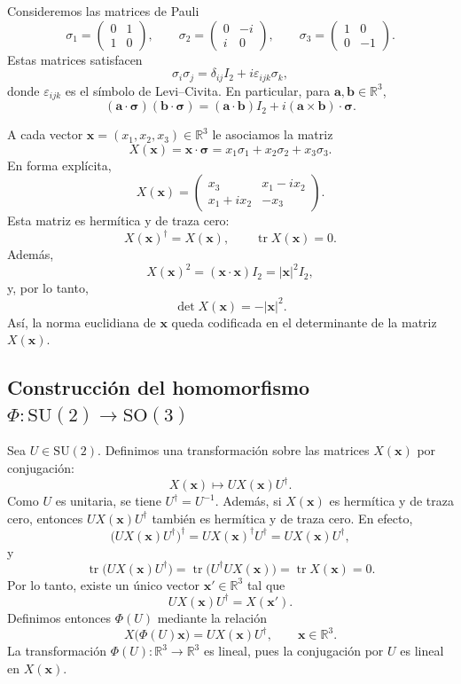 \documentclass[11pt,a4paper]{article}
\newcommand{\R}{\mathbb{R}}
\newcommand{\SU}{\mathrm{SU}}
\newcommand{\SO}{\mathrm{SO}}
\newcommand{\tr}{\operatorname{tr}}
\newcommand{\vect}[1]{\boldsymbol{#1}}
\begin{document}
Consideremos las matrices de Pauli
\[
\sigma_1=\begin{pmatrix}0&1\\1&0\end{pmatrix},\qquad
\sigma_2=\begin{pmatrix}0&-i\\i&0\end{pmatrix},\qquad
\sigma_3=\begin{pmatrix}1&0\\0&-1\end{pmatrix}.
\]
Estas matrices satisfacen
\[
\sigma_i\sigma_j=\delta_{ij}I_2+i\varepsilon_{ijk}\sigma_k,
\]
donde $\varepsilon_{ijk}$ es el símbolo de Levi--Civita. En particular, para $\vect a,\vect b\in\R^3$,
\[
(\vect a\cdot\vect\sigma)(\vect b\cdot\vect\sigma)
=(\vect a\cdot\vect b)I_2+i(\vect a\times\vect b)\cdot\vect\sigma.
\]

A cada vector $\vect x=(x_1,x_2,x_3)\in\R^3$ le asociamos la matriz
\[
X(\vect x)=\vect x\cdot\vect\sigma=x_1\sigma_1+x_2\sigma_2+x_3\sigma_3.
\]
En forma explícita,
\[
X(\vect x)=
\begin{pmatrix}
x_3&x_1-ix_2\\
x_1+ix_2&-x_3
\end{pmatrix}.
\]
Esta matriz es hermítica y de traza cero:
\[
X(\vect x)^\dagger=X(\vect x),\qquad \tr X(\vect x)=0.
\]
Además,
\[
X(\vect x)^2=(\vect x\cdot\vect x)I_2=|\vect x|^2I_2,
\]
y, por lo tanto,
\[
\det X(\vect x)=-|\vect x|^2.
\]
Así, la norma euclidiana de $\vect x$ queda codificada en el determinante de la matriz $X(\vect x)$.

\subsection*{Construcción del homomorfismo $\Phi:\SU(2)\to\SO(3)$}

Sea $U\in\SU(2)$. Definimos una transformación sobre las matrices $X(\vect x)$ por conjugación:
\[
X(\vect x)\longmapsto UX(\vect x)U^\dagger.
\]
Como $U$ es unitaria, se tiene $U^\dagger=U^{-1}$. Además, si $X(\vect x)$ es hermítica y de traza cero, entonces $UX(\vect x)U^\dagger$ también es hermítica y de traza cero. En efecto,
\[
\bigl(UX(\vect x)U^\dagger\bigr)^\dagger
=UX(\vect x)^\dagger U^\dagger
=UX(\vect x)U^\dagger,
\]
y
\[
\tr\bigl(UX(\vect x)U^\dagger\bigr)
=\tr\bigl(U^\dagger U X(\vect x)\bigr)
=\tr X(\vect x)=0.
\]
Por lo tanto, existe un único vector $\vect x'\in\R^3$ tal que
\[
UX(\vect x)U^\dagger=X(\vect x').
\]
Definimos entonces $\Phi(U)$ mediante la relación
\[
X\bigl(\Phi(U)\vect x\bigr)=UX(\vect x)U^\dagger,\qquad \vect x\in\R^3.
\]
La transformación $\Phi(U):\R^3\to\R^3$ es lineal, pues la conjugación por $U$ es lineal en $X(\vect x)$.
\end{document}
